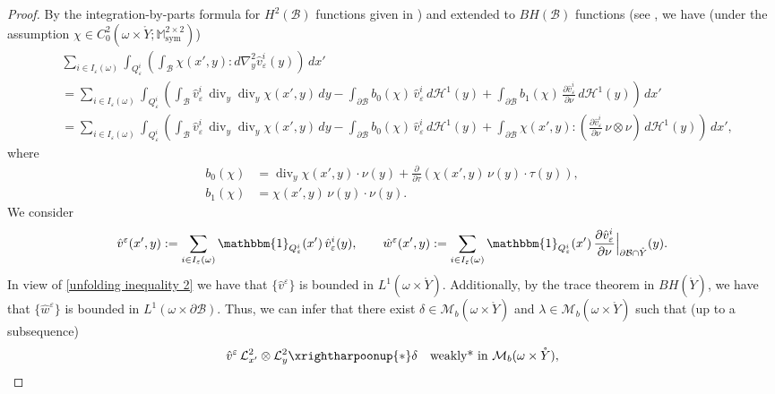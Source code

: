 \documentclass[reqno,10pt]{amsart}
\numberwithin{equation}{section}
\theoremstyle{remark}
\newcommand{\calB}{\mathcal{B}}
\newcommand{\calH}{\mathcal{H}}
\newcommand{\calL}{\mathcal{L}}
\newcommand{\M}{\mathbb{M}}
\DeclareMathOperator{\sym}{sym}
\newcommand{\weakstar}{\xrightharpoonup{*}}
\renewcommand{\div}{\operatorname{div}}
\newcommand{\eps}{\varepsilon}
\newcommand{\Mb}{\mathcal{M}_b}
\newcommand{\charfun}[1]{\mathbbm{1}_{#1}}
\newcommand{\D}{\nabla}
\begin{document}
\begin{proof}
By 
the integration-by-parts formula for $H^2(\calB)$ functions given in \cite[Th\'{e}or\`{e}me 2.3]{Demengel.1983}) and extended to $BH(\calB)$ functions (see \cite[Chapter III, Proposition 2.11]{Temam.1985},
we have (under the assumption $\chi \in C_0^2(\omega \times \mathring{Y};\M^{2 \times 2}_{\sym})$)
\begin{align*} 
	& \sum_{i \in I_\eps(\omega)} \int_{Q_\eps^i} \left( \int_{\calB} \chi(x', y) : d{\D}^2_{y}\hat{v}_\eps^i(y) \right) \,dx'\\
	& = \sum_{i \in I_\eps(\omega)} \int_{Q_\eps^i} \left( \int_{\calB} \hat{v}_\eps^i\,\div_{y}\div_{y}\chi(x',y) \,dy - \int_{\partial\calB} b_0(\chi)\,\hat{v}_\eps^i \,d\calH^{1}(y) + \int_{\partial\calB} b_1(\chi)\,\frac{\partial \hat{v}_\eps^i}{\partial \nu} \,d\calH^{1}(y) \right) \,dx'\\
	& = \sum_{i \in I_\eps(\omega)} \int_{Q_\eps^i} \left( \int_{\calB} \hat{v}_\eps^i\,\div_{y}\div_{y}\chi(x',y) \,dy - \int_{\partial\calB} b_0(\chi)\,\hat{v}_\eps^i \,d\calH^{1}(y) + \int_{\partial\calB} \chi(x', y) : \left(\frac{\partial \hat{v}_\eps^i}{\partial\nu}\, \nu \otimes \nu\right) \,d\calH^{1}(y) \right) \,dx',
\end{align*}
where
\begin{align*}
	b_0(\chi) & = \div_{y}\chi(x',y)\cdot\nu(y) + \frac{\partial}{\partial \tau}\left(\chi(x',y)\,\nu(y)\cdot\tau(y)\right),\\
	b_1(\chi) & = \chi(x',y)\,\nu(y)\cdot\nu(y).
\end{align*}
We consider
\begin{equation*}
	\hat{v}^\eps(x',y) := \sum_{i \in I_\eps(\omega)} \charfun{Q_\eps^i}(x')\,\hat{v}_\eps^i(y), \qquad 
	\hat{w}^\eps(x',y) := \sum_{i \in I_\eps(\omega)} \charfun{Q_\eps^i}(x')\,\frac{\partial \hat{v}_\eps^i}{\partial\nu}\Big|_{\partial \calB \cap \mathring{Y}}(y).
\end{equation*}
In view of \eqref{unfolding inequality 2} we have that $\{\hat{v}^\eps\}$ is bounded in $L^1(\omega \times \mathring{Y})$.
Additionally, by the trace theorem in $BH(\mathring{Y})$, we have that $\{\hat{w}^\eps\}$ is bounded in $L^1(\omega \times \partial\calB)$.
Thus, we can infer that there exist $\delta \in \Mb(\omega \times \mathring{Y})$ and $\lambda \in \Mb(\omega \times \mathring{Y})$ such that (up to a subsequence)
\begin{align}
	\label{vhat^eps convergence in L^1} \hat{v}^\eps \,\calL_{x'}^2 \otimes \calL_{y}^2 & \weakstar \delta \quad \text{weakly* in $\Mb(\omega \times \mathring{Y})$},\\

\end{align}
\end{proof}
\end{document}

